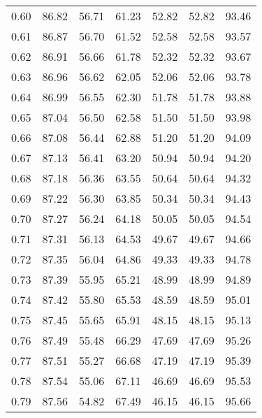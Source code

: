 \begin{tabular}{|c|c|c|c|c|c|c|}
      0.60 &     86.82 &     56.71 &      61.23 &   52.82 &      52.82 &         93.46 \\
      0.61 &     86.87 &     56.70 &      61.52 &   52.58 &      52.58 &         93.57 \\
      0.62 &     86.91 &     56.66 &      61.78 &   52.32 &      52.32 &         93.67 \\
      0.63 &     86.96 &     56.62 &      62.05 &   52.06 &      52.06 &         93.78 \\
      0.64 &     86.99 &     56.55 &      62.30 &   51.78 &      51.78 &         93.88 \\
      0.65 &     87.04 &     56.50 &      62.58 &   51.50 &      51.50 &         93.98 \\
      0.66 &     87.08 &     56.44 &      62.88 &   51.20 &      51.20 &         94.09 \\
      0.67 &     87.13 &     56.41 &      63.20 &   50.94 &      50.94 &         94.20 \\
      0.68 &     87.18 &     56.36 &      63.55 &   50.64 &      50.64 &         94.32 \\
      0.69 &     87.22 &     56.30 &      63.85 &   50.34 &      50.34 &         94.43 \\
      0.70 &     87.27 &     56.24 &      64.18 &   50.05 &      50.05 &         94.54 \\
      0.71 &     87.31 &     56.13 &      64.53 &   49.67 &      49.67 &         94.66 \\
      0.72 &     87.35 &     56.04 &      64.86 &   49.33 &      49.33 &         94.78 \\
      0.73 &     87.39 &     55.95 &      65.21 &   48.99 &      48.99 &         94.89 \\
      0.74 &     87.42 &     55.80 &      65.53 &   48.59 &      48.59 &         95.01 \\
      0.75 &     87.45 &     55.65 &      65.91 &   48.15 &      48.15 &         95.13 \\
      0.76 &     87.49 &     55.48 &      66.29 &   47.69 &      47.69 &         95.26 \\
      0.77 &     87.51 &     55.27 &      66.68 &   47.19 &      47.19 &         95.39 \\
      0.78 &     87.54 &     55.06 &      67.11 &   46.69 &      46.69 &         95.53 \\
      0.79 &     87.56 &     54.82 &      67.49 &   46.15 &      46.15 &         95.66 \\

\end{tabular}
